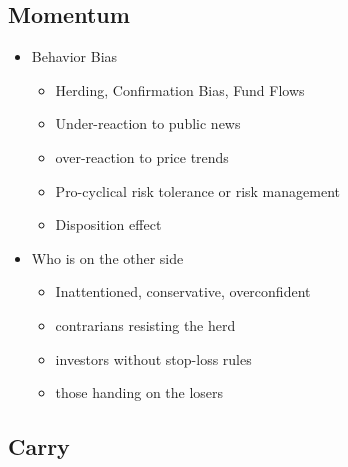 \documentclass[11pt, openany]{book}              %
\begin{document}
\subsection{Momentum}

\begin{itemize}
	\item Behavior Bias 
			\begin{itemize}
				\item Herding, Confirmation Bias, Fund Flows
				\item Under-reaction to public news
				\item over-reaction to price trends
				\item Pro-cyclical risk tolerance or risk management
				\item Disposition effect
			\end{itemize}
	 \item Who is on the other side
			\begin{itemize} 
			 \item Inattentioned, conservative, overconfident
			 \item contrarians resisting the herd
			 \item investors without stop-loss rules
			 \item those handing on the losers
			\end{itemize}
\end{itemize}
\subsection{Carry}
\end{document}
